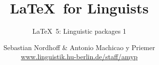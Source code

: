 


\title{
	\LaTeX\ for Linguists
}

\subtitle{\LaTeX\ 5: Linguistic packages 1}

\author[aMyP]{
	{\small Sebastian Nordhoff \& Antonio Machicao y Priemer}
	\\
	{\footnotesize \url{www.linguistik.hu-berlin.de/staff/amyp}}
}








\begin{frame}
  \HUtitle
\end{frame}





\nocite{Freitag&MyP15a}
\nocite{Knuth1986}
\nocite{Kopka94a}
\nocite{MyP17c}
\nocite{MyP&Kerkhof16a}
	


%
%
%
%
%


